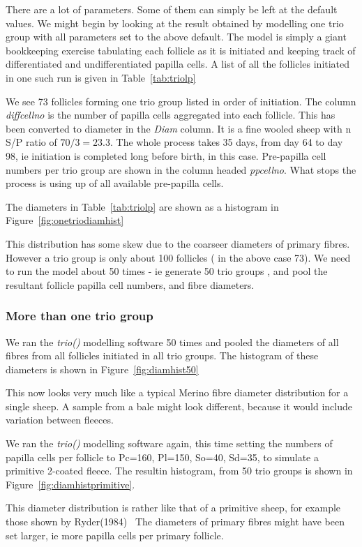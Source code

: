 \documentclass[titlepage]{article}  %
\begin{document}
There are a lot of parameters.  Some of them can simply be left at the default values. We might begin by looking at the result obtained by modelling one trio group with all parameters set to the above default. The model is simply a giant bookkeeping exercise tabulating each follicle as it is initiated and keeping track of differentiated and undifferentiated papilla cells. A list of all the follicles initiated in one such run is given in Table~\ref{tab:triolp}

We see 73 follicles forming one trio group listed in order of initiation.   The column {\em diffcellno} is the number of papilla cells aggregated into each follicle. This has been converted to diameter in the {\em Diam} column.  It is a fine wooled sheep with n S/P ratio of $70/3 = 23.3$. The whole process takes 35 days, from day 64 to day 98, ie initiation is completed long before birth, in this case. Pre-papilla cell numbers per trio group are shown in the column headed {\em ppcellno}. What stops the process is using up of all available pre-papilla cells. 

The diameters in Table~\ref{tab:triolp} are shown as a histogram in Figure~\ref{fig:onetriodiamhist}

This distribution has some skew due to the coarseer diameters of primary fibres. 
However a trio group is only about 100 follicles ( in the above case 73). We need to run the model about 50 times - ie generate 50 trio groups , and pool the resultant follicle papilla cell numbers, and fibre diameters. 

\subsubsection{More than one trio group}
We ran the {\em trio()} modelling software 50 times and pooled the diameters of all fibres from all follicles initiated in all trio groups. The histogram of these diameters is shown in Figure~\ref{fig:diamhist50}

This now looks very much like a typical Merino fibre diameter distribution for a single sheep.  A sample from a bale might look different, because it would include variation between fleeces.

We ran the {\em trio()} modelling software again, this time setting the numbers of papilla cells per follicle to Pc=160, Pl=150, So=40, Sd=35, to simulate a primitive 2-coated fleece. The resultin histogram, from 50 trio groups is shown in Figure~\ref{fig:diamhistprimitive}.

This diameter distribution is rather like that of a primitive sheep, for example those shown by Ryder(1984)~\cite{ryde:84} The diameters of primary fibres might have been set larger, ie more papilla cells per primary follicle.
\end{document}
